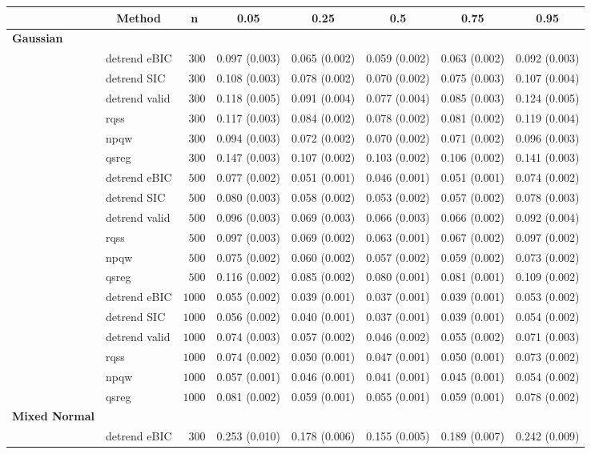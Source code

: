 \begin{table}[!tbp]
\begin{center}
\begin{tabular}{llrlllll}
\hline\hline
\multicolumn{1}{l}{}&\multicolumn{1}{c}{Method}&\multicolumn{1}{c}{n}&\multicolumn{1}{c}{0.05}&\multicolumn{1}{c}{0.25}&\multicolumn{1}{c}{0.5}&\multicolumn{1}{c}{0.75}&\multicolumn{1}{c}{0.95}\tabularnewline
\hline
{\bfseries Gaussian}&&&&&&&\tabularnewline
~~&detrend eBIC&$ 300$&0.097 (0.003)&0.065 (0.002)&0.059 (0.002)&0.063 (0.002)&0.092 (0.003)\tabularnewline
~~&detrend SIC&$ 300$&0.108 (0.003)&0.078 (0.002)&0.070 (0.002)&0.075 (0.003)&0.107 (0.004)\tabularnewline
~~&detrend valid&$ 300$&0.118 (0.005)&0.091 (0.004)&0.077 (0.004)&0.085 (0.003)&0.124 (0.005)\tabularnewline
~~&rqss&$ 300$&0.117 (0.003)&0.084 (0.002)&0.078 (0.002)&0.081 (0.002)&0.119 (0.004)\tabularnewline
~~&npqw&$ 300$&0.094 (0.003)&0.072 (0.002)&0.070 (0.002)&0.071 (0.002)&0.096 (0.003)\tabularnewline
~~&qsreg&$ 300$&0.147 (0.003)&0.107 (0.002)&0.103 (0.002)&0.106 (0.002)&0.141 (0.003)\tabularnewline
~~&detrend eBIC&$ 500$&0.077 (0.002)&0.051 (0.001)&0.046 (0.001)&0.051 (0.001)&0.074 (0.002)\tabularnewline
~~&detrend SIC&$ 500$&0.080 (0.003)&0.058 (0.002)&0.053 (0.002)&0.057 (0.002)&0.078 (0.003)\tabularnewline
~~&detrend valid&$ 500$&0.096 (0.003)&0.069 (0.003)&0.066 (0.003)&0.066 (0.002)&0.092 (0.004)\tabularnewline
~~&rqss&$ 500$&0.097 (0.003)&0.069 (0.002)&0.063 (0.001)&0.067 (0.002)&0.097 (0.002)\tabularnewline
~~&npqw&$ 500$&0.075 (0.002)&0.060 (0.002)&0.057 (0.002)&0.059 (0.002)&0.073 (0.002)\tabularnewline
~~&qsreg&$ 500$&0.116 (0.002)&0.085 (0.002)&0.080 (0.001)&0.081 (0.001)&0.109 (0.002)\tabularnewline
~~&detrend eBIC&$1000$&0.055 (0.002)&0.039 (0.001)&0.037 (0.001)&0.039 (0.001)&0.053 (0.002)\tabularnewline
~~&detrend SIC&$1000$&0.056 (0.002)&0.040 (0.001)&0.037 (0.001)&0.039 (0.001)&0.054 (0.002)\tabularnewline
~~&detrend valid&$1000$&0.074 (0.003)&0.057 (0.002)&0.046 (0.002)&0.055 (0.002)&0.071 (0.003)\tabularnewline
~~&rqss&$1000$&0.074 (0.002)&0.050 (0.001)&0.047 (0.001)&0.050 (0.001)&0.073 (0.002)\tabularnewline
~~&npqw&$1000$&0.057 (0.001)&0.046 (0.001)&0.041 (0.001)&0.045 (0.001)&0.054 (0.002)\tabularnewline
~~&qsreg&$1000$&0.081 (0.002)&0.059 (0.001)&0.055 (0.001)&0.059 (0.001)&0.078 (0.002)\tabularnewline
\hline
{\bfseries Mixed Normal}&&&&&&&\tabularnewline
~~&detrend eBIC&$ 300$&0.253 (0.010)&0.178 (0.006)&0.155 (0.005)&0.189 (0.007)&0.242 (0.009)\tabularnewline

\end{tabular}
\end{center}
\end{table}
